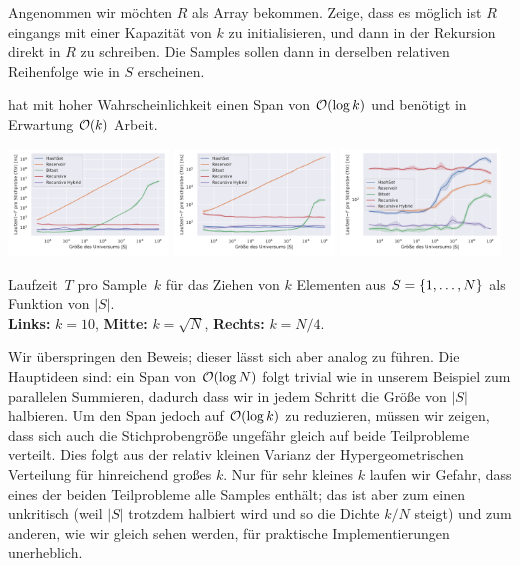 \begin{exercise}
    Angenommen wir möchten $R$ als Array bekommen.
    Zeige, dass es möglich ist $R$ eingangs mit einer Kapazität von $k$ zu initialisieren, und dann in der Rekursion direkt in $R$ zu schreiben.
    Die Samples sollen dann in derselben relativen Reihenfolge wie in $S$ erscheinen.
\end{exercise}

\begin{lemma}
     hat mit hoher Wahrscheinlichkeit einen Span von $\mathcal{O}\!\left(\log k\right)$ und benötigt in Erwartung $\mathcal{O}\!\left(k\right)$ Arbeit.
\end{lemma}

\begin{widefigure}
    \includegraphics[width=0.32\textwidth]{data/gnm_recursive_scale0.pdf}\hfill
    \includegraphics[width=0.32\textwidth]{data/gnm_recursive_scale1.pdf}\hfill
    \includegraphics[width=0.32\textwidth]{data/gnm_recursive_scale2.pdf}

    \caption{
        Laufzeit~$T$ pro Sample~$k$ für das Ziehen von $k$ Elementen aus $S = \left\{1, \ldots, N\right\}$ als Funktion von $|S|$.\\
        \textbf{Links:} $k=10$, \textbf{Mitte: } $k = \sqrt{N}$, \textbf{Rechts: } $k = N / 4$.
    }
    \label{fig:benchmark_gnm_recursive_scale}
\end{widefigure}

Wir überspringen den Beweis; dieser lässt sich aber analog zu \cite{DBLP:journals/toms/Hubschle-Schneider22} führen.
Die Hauptideen sind: ein Span von $\mathcal{O}\!\left(\log N\right)$ folgt trivial wie in unserem Beispiel zum parallelen Summieren, dadurch dass wir in jedem Schritt die Größe von $|S|$ halbieren.
Um den Span jedoch auf $\mathcal{O}\!\left(\log k\right)$ zu reduzieren, müssen wir zeigen, dass sich auch die Stichprobengröße ungefähr gleich auf beide Teilprobleme verteilt.
Dies folgt aus der relativ kleinen Varianz der Hypergeometrischen Verteilung für hinreichend großes $k$.
Nur für sehr kleines $k$ laufen wir Gefahr, dass eines der beiden Teilprobleme alle Samples enthält;
das ist aber zum einen unkritisch (weil $|S|$ trotzdem halbiert wird und so die Dichte $k/N$ steigt) und zum anderen, wie wir gleich sehen werden, für praktische Implementierungen unerheblich.

